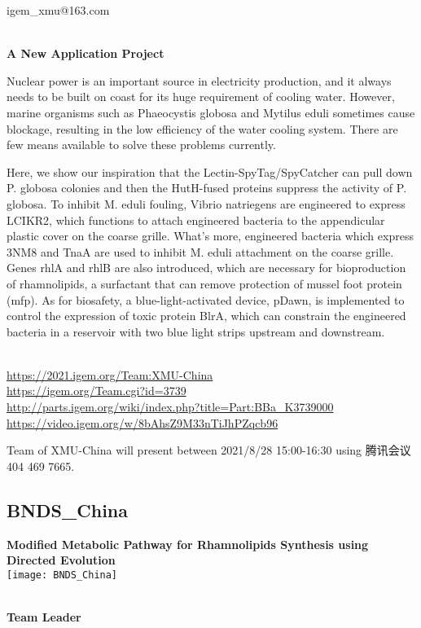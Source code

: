   igem\_xmu@163.com


\textbf{\\A New Application Project\\}\begin{spacing}{1.5}

Nuclear power is an important source in electricity production, and it always needs to be built on coast for its huge requirement of cooling water. However, marine organisms such as Phaeocystis globosa and Mytilus eduli sometimes cause blockage, resulting in the low efficiency of the water cooling system. There are few means available to solve these problems currently.

Here, we show our inspiration that the Lectin-SpyTag/SpyCatcher can pull down P. globosa colonies and then the HutH-fused proteins suppress the activity of P. globosa. To inhibit M. eduli fouling, Vibrio natriegens are engineered to express LCIKR2, which functions to attach engineered bacteria to the appendicular plastic cover on the coarse grille. What’s more, engineered bacteria which express 3NM8 and TnaA are used to inhibit M. eduli attachment on the coarse grille. Genes rhlA and rhlB are also introduced, which are necessary for bioproduction of rhamnolipids, a surfactant that can remove protection of mussel foot protein (mfp). As for biosafety, a blue-light-activated device, pDawn, is implemented to control the expression of toxic protein BlrA, which can constrain the engineered bacteria in a reservoir with two blue light strips upstream and downstream.\end{spacing}
\\

\url{https://2021.igem.org/Team:XMU-China }\\
\url{https://igem.org/Team.cgi?id=3739 }\\
\url{http://parts.igem.org/wiki/index.php?title=Part:BBa_K3739000 }\\
\url{https://video.igem.org/w/8bAhsZ9M33nTiJhPZqcb96 }\\

\vfill{}









Team of XMU-China will present between       2021/8/28 15:00-16:30  using 腾讯会议 404 469 7665.
\newpage


\subsection{\textcolor{Blu}{ BNDS\_China } }
\vspace{5mm}
\begin{center}
\large{
  \textbf{ Modified Metabolic Pathway for Rhamnolipids Synthesis using Directed Evolution }\\
  \texttt{[image: BNDS\_China]}
}
\end{center}
\textbf{\\Team Leader}

